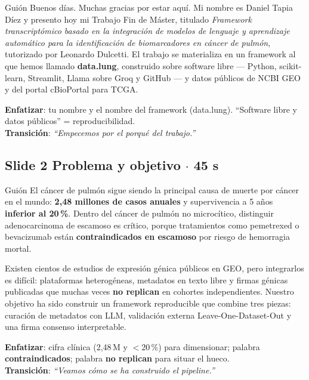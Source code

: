 \documentclass[11pt, a4paper]{article}
\newcommand{\slidebadge}[1]{{\colorbox{verdeTerm}{\color{white}\bfseries\;#1\;}}}
\begin{document}
\begin{guioncaja}{Gui\'on}
Buenos d\'ias. Muchas gracias por estar aqu\'i. Mi nombre es Daniel Tapia D\'iez y presento hoy mi Trabajo Fin de M\'aster, titulado \emph{Framework transcript\'omico basado en la integraci\'on de modelos de lenguaje y aprendizaje autom\'atico para la identificaci\'on de biomarcadores en c\'ancer de pulm\'on}, tutorizado por Leonardo Dulcetti. El trabajo se materializa en un framework al que hemos llamado \textbf{data.lung}, construido sobre software libre --- Python, scikit-learn, Streamlit, Llama sobre Groq y GitHub --- y datos p\'ublicos de NCBI GEO y del portal cBioPortal para TCGA.
\end{guioncaja}

\textbf{Enfatizar}: tu nombre y el nombre del framework (data.lung). ``Software libre y datos p\'ublicos'' = reproducibilidad.\\
\textbf{Transici\'on}: \emph{``Empecemos por el porqu\'e del trabajo.''}

\subsection*{\slidebadge{Slide 2} Problema y objetivo $\cdot$ 45 s}

\begin{guioncaja}{Gui\'on}
El c\'ancer de pulm\'on sigue siendo la principal causa de muerte por c\'ancer en el mundo: \textbf{2,48 millones de casos anuales} y supervivencia a 5 a\~nos \textbf{inferior al 20\,\%}. Dentro del c\'ancer de pulm\'on no microc\'itico, distinguir adenocarcinoma de escamoso es cr\'itico, porque tratamientos como pemetrexed o bevacizumab est\'an \textbf{contraindicados en escamoso} por riesgo de hemorragia mortal.

Existen cientos de estudios de expresi\'on g\'enica p\'ublicos en GEO, pero integrarlos es dif\'icil: plataformas heterog\'eneas, metadatos en texto libre y firmas g\'enicas publicadas que muchas veces \textbf{no replican} en cohortes independientes. Nuestro objetivo ha sido construir un framework reproducible que combine tres piezas: curaci\'on de metadatos con LLM, validaci\'on externa Leave-One-Dataset-Out y una firma consenso interpretable.
\end{guioncaja}

\textbf{Enfatizar}: cifra cl\'inica (2,48\,M y $<$20\,\%) para dimensionar; palabra \textbf{contraindicados}; palabra \textbf{no replican} para situar el hueco.\\
\textbf{Transici\'on}: \emph{``Veamos c\'omo se ha construido el pipeline.''}
\end{document}

